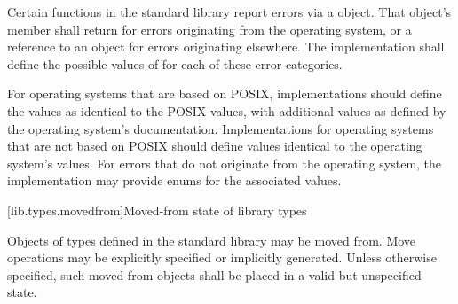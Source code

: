 \pnum
Certain functions in the \Cpp{} standard library report errors via a
 object. That object's
 member shall return  for
errors originating from the operating system, or a reference to an
  object for errors originating elsewhere.
The implementation shall define the possible values of  for each of these
error categories. \begin{example} For operating systems that are based on POSIX,
implementations should define the  values as
identical to the POSIX  values, with additional values as defined by the
operating system's documentation. Implementations for operating systems that are not
based on POSIX should define values identical to the operating system's
values. For errors that do not originate from the operating system, the implementation
may provide enums for the associated values. \end{example}

[lib.types.movedfrom]{Moved-from state of library types}

\pnum
Objects of types defined in the \Cpp{} standard library may be moved
from. Move operations may be explicitly specified or
implicitly generated. Unless otherwise specified, such moved-from objects shall
be placed in a valid but unspecified state.
